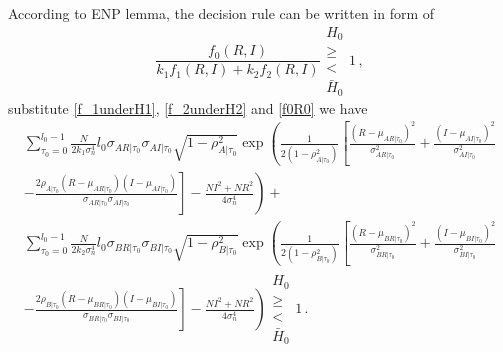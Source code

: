 According to ENP lemma, the decision rule can be written in form of 
\begin{equation}
  \frac{f_0(R,I)}{k_1f_1(R,I)+k_2f_2(R,I)} \substack{H_0 \\ \geq \\ < \\ \bar{H}_0}1\,,
\end{equation}
substitute \eqref{f_1underH1}, \eqref{f_2underH2} and \eqref{f0R0} we have 
\begin{equation}
\begin{split}
\sum_{\tau_0=0}^{l_0-1}\frac{N}{2k_1\sigma_n^4}l_0\sigma_{AR|\tau_0}\sigma_{AI|\tau_0}\sqrt{1-\rho_{A|\tau_0}^2}\exp\left(\frac{1}{2(1-\rho_{A|\tau_0}^2)}\left[ \frac{(R-\mu_{AR|\tau_0})^2}{\sigma_{AR|\tau_0}^2}+\frac{(I-\mu_{AI|\tau_0})^2}{\sigma_{AI|\tau_0}^2} \right. \right. \\
\left. \left.  - \frac{2\rho_{A|\tau_0}(R-\mu_{AR|\tau_0})(I-\mu_{AI|\tau_0})}{\sigma_{AR|\tau_0}\sigma_{AI|\tau_0}} \right] -\frac{NI^2+NR^2}{4\sigma_n^4}\right)
+\\
\sum_{\tau_0=0}^{l_0-1}\frac{N}{2k_2\sigma_n^4}l_0\sigma_{BR|\tau_0}\sigma_{BI|\tau_0}\sqrt{1-\rho_{B|\tau_0}^2}\exp\left(
\frac{1}{2(1-\rho_{B|\tau_0}^2)}\left[ \frac{(R-\mu_{BR|\tau_0})^2}{\sigma_{BR|\tau_0}^2}+\frac{(I-\mu_{BI|\tau_0})^2}{\sigma_{BI|\tau_0}^2} \right. \right. \\
\left. \left. - \frac{2\rho_{B|\tau_0}(R-\mu_{BR|\tau_0})(I-\mu_{BI|\tau_0})}{\sigma_{BR|\tau_0}\sigma_{BI|\tau_0}}  
\right] -\frac{NI^2+NR^2}{4\sigma_n^4}
\right) \substack{H_0 \\ \geq \\ < \\ \bar{H}_0}1\,.
\end{split}
\end{equation}

